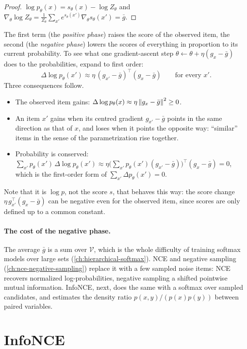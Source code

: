 \begin{notechapter}
\begin{proof}
$\log p_\theta(x) = s_\theta(x) - \log Z_\theta$ and $\nabla_\theta\log Z_\theta = \frac1{Z_\theta}\sum_{x'}e^{s_\theta(x')}\nabla_\theta s_\theta(x') = \bar g$.
\end{proof}

The first term (the \emph{positive phase}) raises the score of the observed item, the second (the
\emph{negative phase}) lowers the scores of everything in proportion to its current probability. To
see what one gradient-ascent step $\theta\leftarrow\theta + \eta(g_x - \bar g)$ does to the probabilities, expand to first order:
\[
  \Delta\log p_\theta(x')\approx\eta\,(g_{x'} - \bar g)^\top(g_x - \bar g)\qquad\text{for every }x' .
\]
Three consequences follow.
\begin{itemize}
  \item The observed item gains: $\Delta\log p_\theta(x)\approx\eta\left\|g_x - \bar g\right\|^2\geq0$.
  \item An item $x'$ gains when its centred gradient $g_{x'} - \bar g$ points in the same direction as that of $x$, and
        loses when it points the opposite way: ``similar'' items in the sense of the
        parametrization rise together.
  \item Probability is conserved: $\sum_{x'}p_\theta(x')\,\Delta\log p_\theta(x')\approx\eta\bigl(\sum_{x'}p_\theta(x')(g_{x'} - \bar g)\bigr)^\top(g_x - \bar g) = 0$, which is the first-order
        form of $\sum_{x'}\Delta p_\theta(x') = 0$.
\end{itemize}
Note that it is $\log p$, not the score $s$, that behaves this way: the score change $\eta\,g_{x'}^\top(g_x - \bar g)$ can be
negative even for the observed item, since scores are only defined up to a common constant.

\paragraph{The cost of the negative phase.} The average $\bar g$ is a sum over $\mathcal V$, which is the whole difficulty
of training softmax models over large sets (\cref{ch:hierarchical-softmax}). NCE and negative
sampling (\cref{ch:nce-negative-sampling}) replace it with a few sampled noise items: NCE recovers
normalized log-probabilities, negative sampling a shifted pointwise mutual information. InfoNCE,
next, does the same with a softmax over sampled candidates, and estimates the density ratio
$p(x, y)/(p(x)p(y))$ between paired variables.

\section{InfoNCE}\label{contrastive-learning:sec:infonce}


\end{notechapter}
